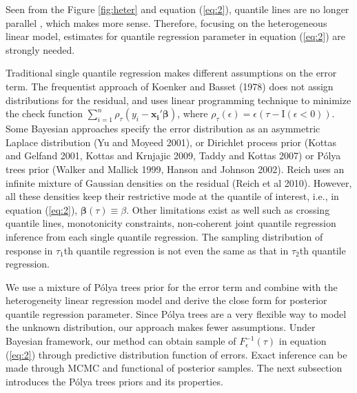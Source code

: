 \documentclass[12pt]{article}
\newcommand{\polya}{P\'{o}lya}
\begin{document}
Seen from the Figure \ref{fig:heter} and equation (\ref{eq:2}), quantile lines
are no longer parallel , which makes more sense. Therefore, focusing on the heterogeneous linear model, estimates
for quantile regression parameter in equation (\ref{eq:2}) are strongly
needed. 

Traditional single quantile regression makes different assumptions on
the error term. The frequentist approach of  Koenker and Basset (1978) does not
assign distributions for the residual, and uses linear
programming technique to minimize the check function $\sum_{i=1}^n
\rho_{\tau}(y_i - \bm{x_i'\beta})$, where $\rho_{\tau}(\epsilon) =
\epsilon (\tau- \mathrm{I}(\epsilon < 0))$. 
Some Bayesian 
approaches specify the error distribution as an asymmetric Laplace
distribution (Yu and Moyeed 2001), or Dirichlet process prior (Kottas
and Gelfand 2001, Kottas and Krnjajic 2009, Taddy and Kottas 2007) or
\polya{} trees prior (Walker and Mallick 1999, Hanson and Johnson
2002). Reich uses an infinite mixture of Gaussian densities on the
residual (Reich et al 2010). However, all these densities keep their
restrictive mode at the quantile of interest, i.e., in equation
(\ref{eq:2}), $\bm{\beta}(\tau) \equiv \beta$. Other limitations exist
as well such as crossing quantile lines, monotonicity constraints,
non-coherent joint quantile regression inference from each single
quantile regression. The sampling distribution of response in
$\tau_1$th quantile regression is not even the same as that in
$\tau_2$th quantile regression.

We use a mixture of \polya{} trees prior for the error term and
combine with the heterogeneity linear regression model and derive the
close form for posterior quantile regression parameter. Since \polya{}
trees are a very flexible way to model the unknown distribution, our
approach makes fewer assumptions. Under Bayesian framework, our method
can obtain sample of $F^{-1}_{\epsilon}(\tau)$ in equation
(\ref{eq:2}) through predictive distribution function of errors. Exact
inference can be made through MCMC and functional of posterior
samples. The next subsection introduces the \polya{} trees priors and
its properties.
\end{document}
